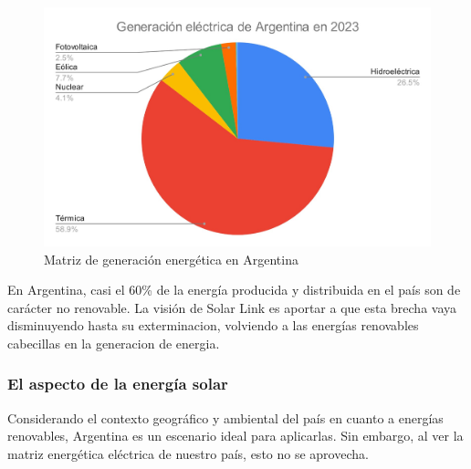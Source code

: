 \begin{figure}[H]
    \centering
    \includegraphics[width=0.85\linewidth]{Intro/Screenshot_20.jpg}
    \caption{Matriz de generación energética en Argentina}
    \label{fig:matriz-energias}
\end{figure}

En Argentina, casi el 60\% de la energía producida y distribuida en el país son de carácter no renovable. La visión de Solar Link es aportar a que esta brecha vaya disminuyendo hasta su exterminacion, volviendo a las energías renovables cabecillas en la generacion de energia. \\

\subsubsection{El aspecto de la energía solar}
Considerando el contexto geográfico y ambiental del país en cuanto a energías renovables, Argentina es un escenario ideal para aplicarlas. Sin embargo, al ver la matriz energética eléctrica de nuestro país, esto no se aprovecha.

